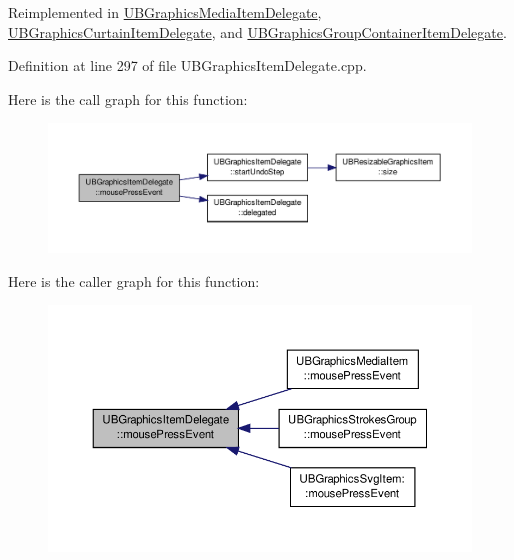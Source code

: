Reimplemented in \hyperlink{class_u_b_graphics_media_item_delegate_a318cc185f2aca7410e47e3954d6f424a}{U\-B\-Graphics\-Media\-Item\-Delegate}, \hyperlink{class_u_b_graphics_curtain_item_delegate_a249f9c655220d2171acea7a3a656c527}{U\-B\-Graphics\-Curtain\-Item\-Delegate}, and \hyperlink{class_u_b_graphics_group_container_item_delegate_a0eef4acf8124b18a6f495402188dbefc}{U\-B\-Graphics\-Group\-Container\-Item\-Delegate}.



Definition at line 297 of file U\-B\-Graphics\-Item\-Delegate.\-cpp.



Here is the call graph for this function\-:
\nopagebreak
\begin{figure}[H]
\begin{center}
\leavevmode
\includegraphics[width=350pt]{dd/dd5/class_u_b_graphics_item_delegate_a1e3cda77c7ecc5f3e8863947b0a8f217_cgraph}
\end{center}
\end{figure}




Here is the caller graph for this function\-:
\nopagebreak
\begin{figure}[H]
\begin{center}
\leavevmode
\includegraphics[width=350pt]{dd/dd5/class_u_b_graphics_item_delegate_a1e3cda77c7ecc5f3e8863947b0a8f217_icgraph}
\end{center}
\end{figure}


